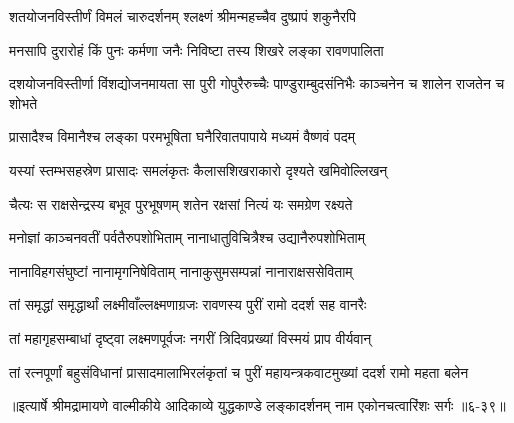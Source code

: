 \twolineshloka
{शतयोजनविस्तीर्णं विमलं चारुदर्शनम्}
{श्लक्ष्णं श्रीमन्महच्चैव दुष्प्रापं शकुनैरपि} %

\twolineshloka
{मनसापि दुरारोहं किं पुनः कर्मणा जनैः}
{निविष्टा तस्य शिखरे लङ्का रावणपालिता} %

\threelineshloka
{दशयोजनविस्तीर्णा विंशद्योजनमायता}
{सा पुरी गोपुरैरुच्चैः पाण्डुराम्बुदसंनिभैः}
{काञ्चनेन च शालेन राजतेन च शोभते} %

\twolineshloka
{प्रासादैश्च विमानैश्च लङ्का परमभूषिता}
{घनैरिवातपापाये मध्यमं वैष्णवं पदम्} %

\twolineshloka
{यस्यां स्तम्भसहस्रेण प्रासादः समलंकृतः}
{कैलासशिखराकारो दृश्यते खमिवोल्लिखन्} %

\twolineshloka
{चैत्यः स राक्षसेन्द्रस्य बभूव पुरभूषणम्}
{शतेन रक्षसां नित्यं यः समग्रेण रक्ष्यते} %

\twolineshloka
{मनोज्ञां काञ्चनवतीं पर्वतैरुपशोभिताम्}
{नानाधातुविचित्रैश्च उद्यानैरुपशोभिताम्} %

\twolineshloka
{नानाविहगसंघुष्टां नानामृगनिषेविताम्}
{नानाकुसुमसम्पन्नां नानाराक्षससेविताम्} %

\twolineshloka
{तां समृद्धां समृद्धार्थां लक्ष्मीवाँल्लक्ष्मणाग्रजः}
{रावणस्य पुरीं रामो ददर्श सह वानरैः} %

\twolineshloka
{तां महागृहसम्बाधां दृष्ट्वा लक्ष्मणपूर्वजः}
{नगरीं त्रिदिवप्रख्यां विस्मयं प्राप वीर्यवान्} %

\twolineshloka
{तां रत्नपूर्णां बहुसंविधानां प्रासादमालाभिरलंकृतां च}
{पुरीं महायन्त्रकवाटमुख्यां ददर्श रामो महता बलेन} %


॥इत्यार्षे श्रीमद्रामायणे वाल्मीकीये आदिकाव्ये युद्धकाण्डे लङ्कादर्शनम् नाम एकोनचत्वारिंशः सर्गः ॥६-३९॥
